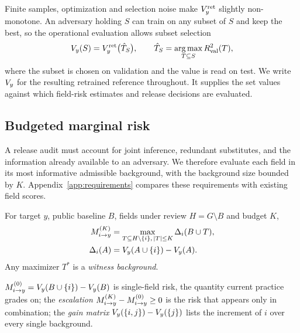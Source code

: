 Finite samples, optimization and selection noise make $V_y^{\mathrm{ret}}$ slightly
non-monotone. An adversary holding $S$ can train on any subset of $S$ and keep the best, so
the operational evaluation allows subset selection
\begin{equation}\label{eq:closure}
V_y(S) = V_y^{\mathrm{ret}}\big(\hat T_S\big), \qquad
\hat T_S = \operatorname*{arg\,max}_{T \subseteq S} R^2_{\mathrm{val}}(T),
\end{equation}
where the subset is chosen on validation and the value is read on test. We write $V_y$ for the resulting retrained reference throughout. It supplies the set values against which field-risk estimates and release decisions are evaluated.

\subsection{Budgeted marginal risk}\label{sec:mk}
A release audit must account for joint inference, redundant substitutes, and the information already available to an adversary. We therefore evaluate each field in its most informative admissible background, with the background size bounded by $K$. Appendix~\ref{app:requirements} compares these requirements with existing field scores.

\begin{definition}\label{def:mk}
For target $y$, public baseline $B$, fields under review $H=G\setminus B$ and budget $K$,
\begin{equation}\label{eq:mk}
\begin{aligned}
M^{(K)}_{i\to y} &= \max_{T \subseteq H \setminus \{i\},\, |T| \le K} \Delta_i(B\cup T),\\
\Delta_i(A)&=V_y(A \cup \{i\}) - V_y(A).
\end{aligned}
\end{equation}
Any maximizer $T^{*}$ is a \emph{witness background}.
\end{definition}
$M^{(0)}_{i\to y}=V_y(B\cup\{i\})-V_y(B)$ is single-field risk, the quantity current practice
grades on; the \emph{escalation} $M^{(K)}_{i\to y}-M^{(0)}_{i\to y}\ge 0$ is the risk that appears only in
combination; the \emph{gain matrix} $V_y(\{i,j\})-V_y(\{j\})$ lists the increment of $i$ over
every single background.

